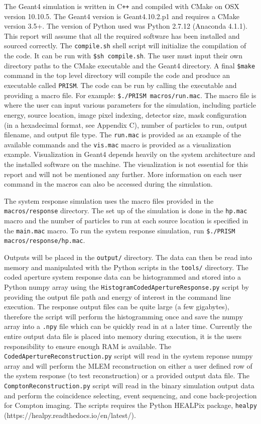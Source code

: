 \documentclass[10pt]{article}
\begin{document}
The Geant4 simulation is written in C\verb!++! and compiled with CMake on OSX version 10.10.5. The Geant4 version is Geant4.10.2.p1 and requires a CMake version 3.5+. The version of Python used was Python 2.7.12  (Anaconda 4.1.1). This report will assume that all the required software has been installed and sourced correctly. The \verb!compile.sh! shell script will initialize the compilation of the code. It can be run with \verb!$sh compile.sh!. The user must input their own directory paths to the CMake executable and the Geant4 directory. A final \verb!$make! command in the top level directory will compile the code and produce an executable called \verb!PRISM!. The code can be run by calling the executable and providing a macro file. For example: \verb!$./PRISM macros/run.mac!. The macro file is where the user can input various parameters for the simulation, including particle energy, source location, image pixel indexing, detector size, mask configuration (in a hexadecimal format, see Appendix C), number of particles to run, output filename, and output file type. The \verb!run.mac! is provided as an example of the available commands and the \verb!vis.mac! macro is provided as a visualization example. Visualization in Geant4 depends heavily on the system architecture and the installed software on the machine. The visualization is not essential for this report and will not be mentioned any further. More information on each user command in the macros can also be accessed during the simulation.

The system response simulation uses the macro files provided in the \verb!macros/response! directory. The set up of the simulation is done in the \verb!hp.mac! macro and the number of particles to run at each source location is specified in the \verb!main.mac! macro. To run the system response simulation, run \verb!$./PRISM macros/response/hp.mac!. 

Outputs will be placed in the \verb!output/! directory. The data can then be read into memory and manipulated with the Python scripts in the \verb!tools/! directory. The coded aperture system response data can be histogrammed and stored into a Python numpy array using the \verb!HistogramCodedApertureResponse.py! script by providing the output file path and energy of interest in the command line execution. The response output files can be quite large (a few gigabytes), therefore the script will perform the histogramming once and save the numpy array into a \verb!.npy! file which can be quickly read in at a later time. Currently the entire output data file is placed into memory during execution, it is the users responsibility to ensure enough RAM is available. The \verb!CodedApertureReconstruction.py! script will read in the system reponse numpy array and will perform the MLEM reconstruction on either a user defined row of the system response (to test reconstruction) or a provided output data file. The \verb!ComptonReconstruction.py! script will read in the binary simulation output data and perform the coincidence selecting, event sequencing, and cone back-projection for Compton imaging. The scripts requires the Python HEALPix package, \verb!healpy! (https://healpy.readthedocs.io/en/latest/).
\end{document}
